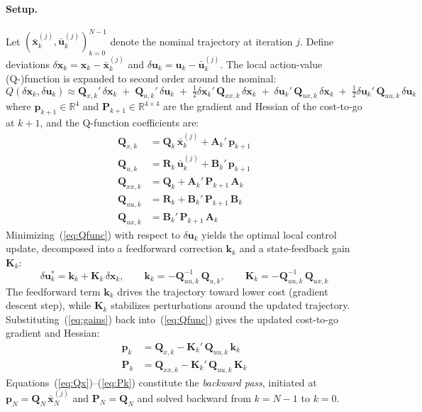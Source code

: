 \paragraph{Setup.}
Let $(\bar{\bm{x}}_k^{(j)}, \bar{\bm{u}}_k^{(j)})_{k=0}^{N-1}$ denote the nominal
trajectory at iteration $j$. Define deviations $\delta\bm{x}_k = \bm{x}_k -
\bar{\bm{x}}_k^{(j)}$ and $\delta\bm{u}_k = \bm{u}_k - \bar{\bm{u}}_k^{(j)}$.
The local action-value (Q-)function is expanded to second order around the nominal:
%
\begin{equation}
    Q(\delta\bm{x}_k, \delta\bm{u}_k) \approx
    \bm{Q}_{x,k}'\,\delta\bm{x}_k
    \;+\; \bm{Q}_{u,k}'\,\delta\bm{u}_k
    \;+\; \tfrac{1}{2}\delta\bm{x}_k'\,\bm{Q}_{xx,k}\,\delta\bm{x}_k
    \;+\; \delta\bm{u}_k'\,\bm{Q}_{ux,k}\,\delta\bm{x}_k
    \;+\; \tfrac{1}{2}\delta\bm{u}_k'\,\bm{Q}_{uu,k}\,\delta\bm{u}_k
    \label{eq:Qfunc}
\end{equation}
%
where $\bm{p}_{k+1} \in \mathbb{R}^4$ and $\bm{P}_{k+1} \in \mathbb{R}^{4\times 4}$
are the gradient and Hessian of the cost-to-go at $k+1$, and the Q-function
coefficients are:
%
\begin{align}
    \bm{Q}_{x,k}  &= \bm{Q}_k\,\bar{\bm{x}}_k^{(j)} + \bm{A}_k'\,\bm{p}_{k+1}
    \label{eq:Qx} \\[4pt]
    \bm{Q}_{u,k}  &= \bm{R}_k\,\bar{\bm{u}}_k^{(j)} + \bm{B}_k'\,\bm{p}_{k+1}
    \label{eq:Qu} \\[4pt]
    \bm{Q}_{xx,k} &= \bm{Q}_k + \bm{A}_k'\,\bm{P}_{k+1}\,\bm{A}_k
    \label{eq:Qxx} \\[4pt]
    \bm{Q}_{uu,k} &= \bm{R}_k + \bm{B}_k'\,\bm{P}_{k+1}\,\bm{B}_k
    \label{eq:Quu} \\[4pt]
    \bm{Q}_{ux,k} &= \bm{B}_k'\,\bm{P}_{k+1}\,\bm{A}_k
    \label{eq:Qux}
\end{align}
%
Minimizing~(\ref{eq:Qfunc}) with respect to $\delta\bm{u}_k$ yields the optimal
local control update, decomposed into a feedforward correction $\bm{k}_k$ and a
state-feedback gain $\bm{K}_k$:
%
\begin{equation}
    \delta\bm{u}_k^* = \bm{k}_k + \bm{K}_k\,\delta\bm{x}_k,
    \qquad
    \bm{k}_k = -\bm{Q}_{uu,k}^{-1}\,\bm{Q}_{u,k},
    \qquad
    \bm{K}_k = -\bm{Q}_{uu,k}^{-1}\,\bm{Q}_{ux,k}
    \label{eq:gains}
\end{equation}
%
The feedforward term $\bm{k}_k$ drives the trajectory toward lower cost (gradient
descent step), while $\bm{K}_k$ stabilizes perturbations around the updated
trajectory. Substituting~(\ref{eq:gains}) back into~(\ref{eq:Qfunc}) gives the
updated cost-to-go gradient and Hessian:
%
\begin{align}
    \bm{p}_k &= \bm{Q}_{x,k} - \bm{K}_k'\,\bm{Q}_{uu,k}\,\bm{k}_k
    \label{eq:pk} \\[4pt]
    \bm{P}_k &= \bm{Q}_{xx,k} - \bm{K}_k'\,\bm{Q}_{uu,k}\,\bm{K}_k
    \label{eq:Pk}
\end{align}
%
Equations~(\ref{eq:Qx})--(\ref{eq:Pk}) constitute the \emph{backward pass},
initiated at $\bm{p}_N = \bm{Q}_N\,\bar{\bm{x}}_N^{(j)}$ and
$\bm{P}_N = \bm{Q}_N$ and solved backward from $k = N-1$ to $k=0$.

